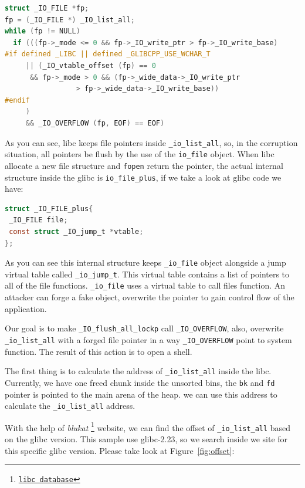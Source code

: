 \documentclass{masterthesis}
\newcommand*\libc{glibc}
\newcommand*\ub{unsorted bins}
\begin{document}
\begin{lstlisting}[language=c,frame=tlrb]
struct _IO_FILE *fp;
fp = (_IO_FILE *) _IO_list_all;
while (fp != NULL)
  if (((fp->_mode <= 0 && fp->_IO_write_ptr > fp->_IO_write_base)
#if defined _LIBC || defined _GLIBCPP_USE_WCHAR_T
	 || (_IO_vtable_offset (fp) == 0
	  && fp->_mode > 0 && (fp->_wide_data->_IO_write_ptr
				 > fp->_wide_data->_IO_write_base))
#endif
	 )
	 && _IO_OVERFLOW (fp, EOF) == EOF)
\end{lstlisting}

As you can see, libc keeps file pointers inside \lstinline{_io_list_all}, so, in the corruption situation, all pointers be flush by the use of the \lstinline{io_file} object. When libc allocate a new file structure and \lstinline{fopen} return the pointer, the actual internal structure inside the \libc{} is \lstinline{io_file_plus}, if we take a look at \libc{} code we have:

\begin{lstlisting}[language=c,frame=tlrb]
struct _IO_FILE_plus{
 _IO_FILE file;
 const struct _IO_jump_t *vtable;
};
\end{lstlisting}

As you can see this internal structure keeps \lstinline{_io_file} object alongside a jump virtual table called \lstinline{_io_jump_t}. This virtual table contains a list of pointers to all of the file functions. \lstinline{_io_file} uses a virtual table to call files function. An attacker can forge a fake object, overwrite the pointer to gain control flow of the application.

Our goal is to make \lstinline{_IO_flush_all_lockp} call \lstinline{_IO_OVERFLOW}, also, overwrite \lstinline{_io_list_all} with a forged file pointer in a way \lstinline{_IO_OVERFLOW} point to system function. The result of this action is to open a shell.

The first thing is to calculate the address of \lstinline{_io_list_all} inside the libc. Currently, we have one freed chunk inside the \ub{}, the \lstinline{bk} and \lstinline{fd} pointer is pointed to the main arena of the heap. we can use this address to calculate the \lstinline{_io_list_all} address.

With the help of \emph{blukat} \footnote{\href{https://libc.blukat.me}{\texttt{libc database}}} website, we can find the offset of \lstinline{_io_list_all} based on the \libc{} version. This sample use \libc{-2.23}, so we search inside we site for this specific \libc{} version. Please take look at Figure~\ref{fig:offset}:
\end{document}
